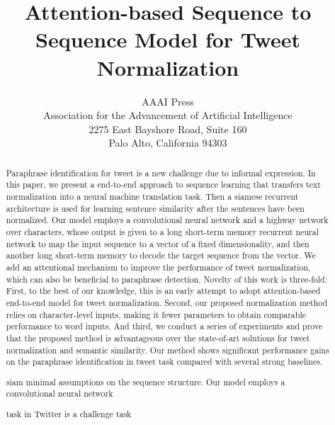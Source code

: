 \documentclass[letterpaper]{article}
\begin{document}
%
\title{Attention-based Sequence to Sequence Model for Tweet Normalization}
\author{AAAI Press\\
Association for the Advancement of Artificial Intelligence\\
2275 East Bayshore Road, Suite 160\\
Palo Alto, California 94303\\
}
\maketitle
\begin{abstract}
	Paraphrase identification for tweet is a new challenge due to informal expression. In this paper, we present a end-to-end approach to sequence learning that transfers text normalization into a neural machine translation task. Then a siamese recurrent architecture is used for learning sentence similarity after the sentences have been normalized. Our model employs a convolutional neural network and a highway network over characters, whose output is given to a long short-term memory recurrent neural network to map the input sequence to a vector of a fixed dimensionality, and then another long short-term memory to decode the target sequence from the vector. We add an attentional mechanism to improve the performance of tweet normalization, which can also be beneficial to paraphrase detection. Novelty of this work is three-fold: First, to the best of our knowledge, this is an early attempt to adopt attention-based end-to-end model for tweet normalization. Second, our proposed normalization method relies on  
	character-level inputs, making it fewer parameters to obtain comparable performance to word inputs. And third, we conduct a series of experiments and prove that the proposed method is advantageous over the state-of-art solutions for tweet normalization and semantic similarity. Our method shows significant performance gains on the paraphrase identification in tweet task compared with several strong baselines. 
	
	siam  minimal assumptions on the sequence structure. Our model employs a convolutional neural network 
	
	task   in Twitter is a challenge task
	

\end{abstract}
\end{document}
